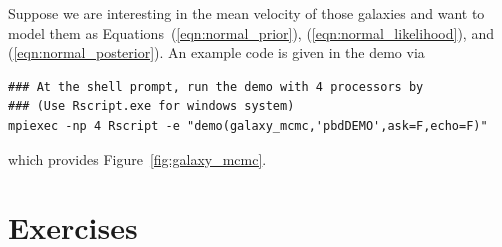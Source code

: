 Suppose we are interesting in the mean velocity of those galaxies and want to
model them as Equations~(\ref{eqn:normal_prior}), (\ref{eqn:normal_likelihood}),
and (\ref{eqn:normal_posterior}).
An example code is given in the  demo via
\begin{lstlisting}
### At the shell prompt, run the demo with 4 processors by
### (Use Rscript.exe for windows system)
mpiexec -np 4 Rscript -e "demo(galaxy_mcmc,'pbdDEMO',ask=F,echo=F)"
\end{lstlisting}
which provides Figure~\ref{fig:galaxy_mcmc}.







\section{Exercises}
\label{sec:mle_exercise}

